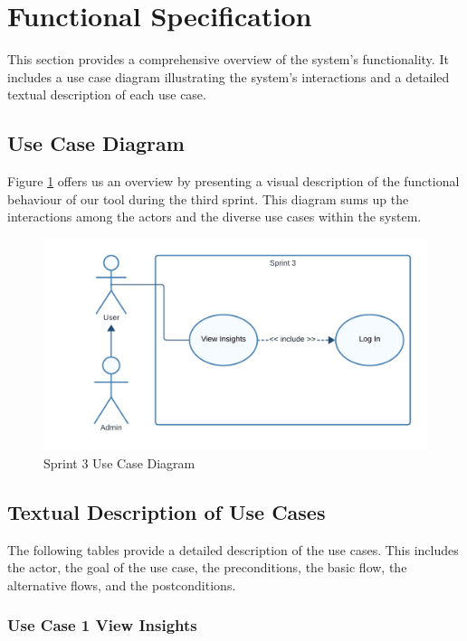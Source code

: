\section{Functional Specification}

This section provides a comprehensive overview of the system's functionality. It includes a use case diagram illustrating the system's interactions and a detailed textual description of each use case.

\subsection{Use Case Diagram}

Figure \ref{fig:Sprint 3 Use Case Diagram} offers us an overview by presenting a visual description of the functional
behaviour of our tool during the third sprint. This diagram sums up the interactions among the actors and the
diverse use cases within the system.

\begin{figure}[ht]
	\centering
	\includegraphics[width=\linewidth]{Images/Sprint3/use case diag.png}
	\caption{Sprint 3 Use Case Diagram}
	\label{fig:Sprint 3 Use Case Diagram}
\end{figure}

\subsection{Textual Description of Use Cases}

The following tables provide a detailed description of the use cases. This includes the actor, the goal of the use case, the preconditions, the basic flow, the alternative flows, and the postconditions.

\subsubsection{Use Case 1 View Insights}


